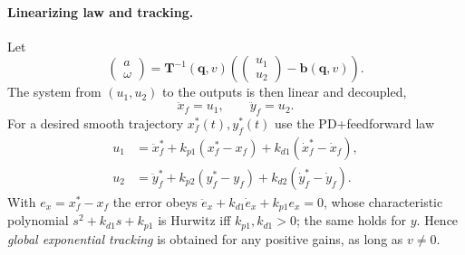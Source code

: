 \documentclass[11pt,a4paper]{article}
\theoremstyle{definition}
\theoremstyle{plain}
\theoremstyle{remark}
\newcommand{\q}{\boldsymbol{q}}
\newcommand{\Tm}{\boldsymbol{T}}
\newcommand{\bb}{\boldsymbol{b}}
\begin{document}
\paragraph{Linearizing law and tracking.} Let
\begin{equation}
  \begin{pmatrix}a\\ \omega\end{pmatrix}=\Tm^{-1}(\q,v)\left(\begin{pmatrix}u_1\\u_2\end{pmatrix}-\bb(\q,v)\right).
  \label{eq:fl}
\end{equation}
The system from $(u_1,u_2)$ to the outputs is then linear and decoupled,
\[
  \ddot x_f=u_1,\qquad \ddot y_f=u_2 .
\]
For a desired smooth trajectory $x_f^*(t),y_f^*(t)$ use the PD+feedforward law
\begin{align}
  u_1&=\ddot x_f^*+k_{p1}(x_f^*-x_f)+k_{d1}(\dot x_f^*-\dot x_f),\\
  u_2&=\ddot y_f^*+k_{p2}(y_f^*-y_f)+k_{d2}(\dot y_f^*-\dot y_f).
\end{align}
With $e_x=x_f^*-x_f$ the error obeys $\ddot e_x+k_{d1}\dot e_x+k_{p1}e_x=0$, whose characteristic polynomial $s^2+k_{d1}s+k_{p1}$ is Hurwitz iff $k_{p1},k_{d1}>0$; the same holds for $y$. Hence \emph{global exponential tracking} is obtained for any positive gains, as long as $v\neq0$.
\end{document}
